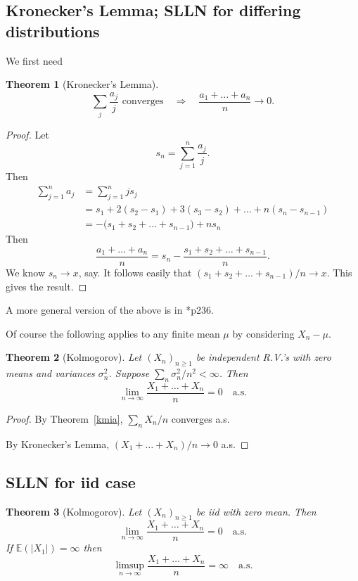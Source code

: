 \documentclass[a4paper]{amsart}
\theoremstyle{plain}
\newtheorem{theorem}{Theorem}[section]
\theoremstyle{definition}
\theoremstyle{remark}
\begin{document}
\subsection{Kronecker's Lemma; SLLN for differing distributions}  
 
 We first need
 \begin{theorem}[Kronecker's Lemma] 
 \[
  \sum_j \frac{a_j}{j} \text{ converges} \quad  \Longrightarrow \quad  \frac{a_1 + \dots + a_n}{n} \to 0.
  \]
 \end{theorem}
 
 
\begin{proof}  Let
\[  
s_n = \sum_{j=1}^n \frac{a_j}{j}  . 
\] 
Then
\begin{align*} 
\sum_{j=1}^n a_j  &=  \sum_{j=1}^n j s_j\\
   &= s_1 + 2(s_2 - s_1 ) + 3(s_3 - s_2 )+ \dots + n(s_n - s_{n-1})\\
  & = -\big(s_1 +s_2+ \dots + s_{n-1} \big)+ n s_n
\end{align*} 
Then 
\[
 \frac{a_1 + \dots + a_n}{n} = s_n - \frac{ s_1 +s_2+ \dots + s_{n-1}  } {n}  .
\]
We know $ s_n \to x $, say.  It follows easily that $ (s_1 +s_2+ \dots + s_{n-1})/n \to x $. This gives the result.
\end{proof} 

A more general version of the above is in \cite{Ash}*{p236}.


Of course the following applies to any finite mean $ \mu $ by considering $ X_n - \mu $.
\begin{theorem}[Kolmogorov] \label{ksl} Let $ (X_n)_{n\geq 1}   $ be independent R.V.'s with zero means and variances $ \sigma _n^2 $.  Suppose $ \sum_n \sigma ^2_n/n^2 < \infty $.  Then
 \[
\lim_{n\to \infty}\frac{X_1+\dots +X_n}{n} = 0 \quad \text{a.s.}
\]
\end{theorem}

\begin{proof} By Theorem~\ref{kmia}, $ \sum_n X_n/n $ converges a.s.  
 
 By Kronecker's Lemma, $ (X_1 + \dots + X_n )/n \to 0 $ a.s.
\end{proof} 


\subsection{SLLN for iid case}

\begin{theorem}[Kolmogorov] Let $ (X_n)_{n\geq 1}   $ be iid with zero mean.  Then
 \[
\lim_{n\to \infty}\frac{X_1+\dots +X_n}{n} = 0 \quad \text{a.s.}
\]
If $ \mathbb{E}( |X_1| )= \infty $ then 
\[
\limsup_{n\to \infty } \frac{X_1+\dots +X_n}{n} =\infty  \quad \text{a.s.}
\]
\end{theorem}
\end{document}
